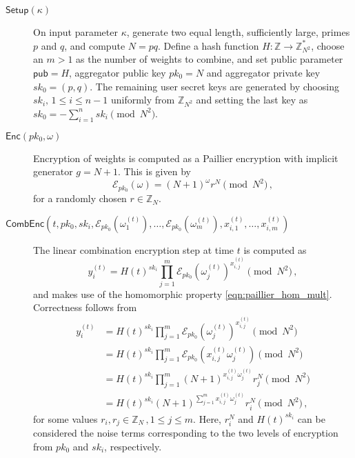 \documentclass[twocolumn]{autart}
\begin{document}
\begin{description}
    \item[$\mathsf{Setup}(\kappa)$] On input parameter $\kappa$, generate two equal length, sufficiently large, primes $p$ and $q$, and compute $N=pq$. Define a hash function $H:\mathbb{Z} \rightarrow \mathbb{Z}_{N^2}^*$, choose an $m>1$ as the number of weights to combine, and set public parameter $\mathsf{pub}=H$, aggregator public key $pk_0 = N$ and aggregator private key $sk_0=(p,q)$. The remaining user secret keys are generated by choosing $sk_i,\,1\leq i\leq n-1$ uniformly from $\mathbb{Z}_{N^2}$ and setting the last key as $sk_0 = -\sum^{n}_{i=1}sk_i \pmod{N^2}$.
 
    \item[$\mathsf{Enc}(pk_0, \omega)$] Encryption of weights is computed as a Paillier encryption with implicit generator $g=N+1$. This is given by
    \begin{equation}
        \mathcal{E}_{pk_0}(\omega) = (N+1)^{\omega}r^N \pmod{N^2}\,,
    \end{equation}
    for a randomly chosen $r \in \mathbb{Z}_N$.

    \item[$\mathsf{CombEnc}(t, pk_0, sk_i, \mathcal{E}_{pk_0}(\omega_1^{(t)}),\dots,\mathcal{E}_{pk_0}(\omega_m^{(t)}), x^{(t)}_{i,1},\dots,x^{(t)}_{i,m})$] The linear combination encryption step at time $t$ is computed as 
    \begin{equation}
        y^{(t)}_i = H(t)^{sk_i}\prod^{m}_{j=1}\mathcal{E}_{pk_0}(\omega^{(t)}_j)^{x^{(t)}_{i,j}} \pmod{N^2}\,,\label{eqn:our_scheme_lin_comb}
    \end{equation}
    and makes use of the homomorphic property \eqref{eqn:paillier_hom_mult}. Correctness follows from
    \begin{equation*}
        \begin{split}
             y^{(t)}_i &= H(t)^{sk_i}\prod^{m}_{j=1}\mathcal{E}_{pk_0}(\omega^{(t)}_j)^{x^{(t)}_{i,j}} \pmod{N^2} \\
            &= H(t)^{sk_i}\prod^{m}_{j=1}\mathcal{E}_{pk_0}(x^{(t)}_{i,j}\omega^{(t)}_j) \pmod{N^2} \\
            &= H(t)^{sk_i}\prod^{m}_{j=1}(N+1)^{x^{(t)}_{i,j}\omega^{(t)}_j} r^{N}_{j} \pmod{N^2} \\
            &= H(t)^{sk_i}(N+1)^{\sum^{m}_{j=1}x^{(t)}_{i,j}\omega^{(t)}_j} r_{i}^{N} \pmod{N^2}\,,
        \end{split}
    \end{equation*}
    for some values $r_i,r_j \in \mathbb{Z}_N\,,1\leq j \leq m$. Here, $r_i^N$ and $H(t)^{sk_i}$ can be considered the noise terms corresponding to the two levels of encryption from $pk_0$ and $sk_i$, respectively.


\end{description}
\end{document}
